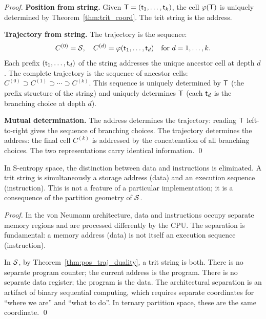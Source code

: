 \begin{proof}
\textbf{Position from string.} Given $\mathsf{T} = (\mathsf{t}_1, \ldots, \mathsf{t}_k)$,
the cell $\varphi(\mathsf{T})$ is uniquely determined by Theorem~\ref{thm:trit_coord}.
The trit string is the address.

\textbf{Trajectory from string.} The trajectory is the sequence:
\begin{equation}
  C^{(0)} = \mathcal{S}, \quad C^{(d)} = \varphi(\mathsf{t}_1, \ldots, \mathsf{t}_d) \quad \text{for } d = 1, \ldots, k.
\end{equation}
Each prefix $(\mathsf{t}_1, \ldots, \mathsf{t}_d)$ of the string addresses the unique
ancestor cell at depth $d$. The complete trajectory is the sequence of ancestor
cells: $C^{(0)} \supset C^{(1)} \supset \cdots \supset C^{(k)}$. This
sequence is uniquely determined by $\mathsf{T}$ (the prefix structure of the string)
and uniquely determines $\mathsf{T}$ (each $\mathsf{t}_d$ is the branching choice at
depth $d$).

\textbf{Mutual determination.} The address determines the trajectory:
reading $\mathsf{T}$ left-to-right gives the sequence of branching choices.
The trajectory determines the address: the final cell $C^{(k)}$ is addressed
by the concatenation of all branching choices. The two representations carry
identical information. \qed
\end{proof}

\begin{corollary}
\label{cor:von_neumann_collapse}
In S-entropy space, the distinction between data and instructions is eliminated.
A trit string is simultaneously a storage address (data) and an execution
sequence (instruction). This is not a feature of a particular implementation;
it is a consequence of the partition geometry of $\mathcal{S}$.
\end{corollary}

\begin{proof}
In the von Neumann architecture, data and instructions occupy separate memory
regions and are processed differently by the CPU. The separation is fundamental:
a memory address (data) is not itself an execution sequence (instruction).

In $\mathcal{S}$, by Theorem~\ref{thm:pos_traj_duality}, a trit string is both.
There is no separate program counter; the current address is the program.
There is no separate data register; the program is the data. The architectural
separation is an artifact of binary sequential computing, which requires separate
coordinates for ``where we are'' and ``what to do''. In ternary partition space,
these are the same coordinate. \qed
\end{proof}

